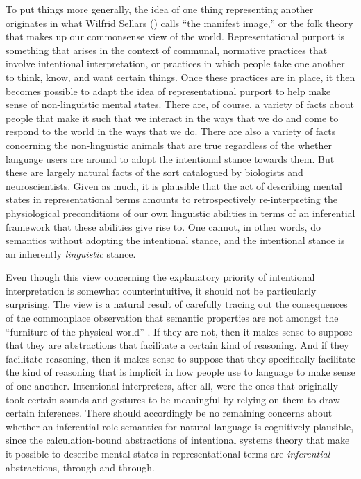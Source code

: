 To put things more generally, the idea of one thing representing another originates in what Wilfrid Sellars (\citeyear{Sellars:1963}) calls ``the manifest image,'' or the folk theory that makes up our commonsense view of the world. Representational purport is something that arises in the context of communal, normative practices that involve intentional interpretation, or practices in which people take one another to think, know, and want certain things. Once these practices are in place, it then becomes possible to adapt the idea of representational purport to help make sense of non-linguistic mental states. There are, of course, a variety of facts about people that make it such that we interact in the ways that we do and come to respond to the world in the ways that we do. There are also a variety of facts concerning the non-linguistic animals that are true regardless of the whether language users are around to adopt the intentional stance towards them. But these are largely natural facts of the sort catalogued by biologists and neuroscientists. Given as much, it is plausible that the act of describing mental states in representational terms amounts to retrospectively re-interpreting the physiological preconditions of our own linguistic abilities in terms of an inferential framework that these abilities give rise to. One cannot, in other words, do semantics without adopting the intentional stance, and the intentional stance is an inherently \textit{linguistic} stance. 

Even though this view concerning the explanatory priority of intentional interpretation is somewhat counterintuitive, it should not be particularly surprising. The view is a natural result of carefully tracing out the consequences of the commonplace observation that semantic properties are not amongst the ``furniture of the physical world'' \citep[][p. 72]{Dennett:1987}. If they are not, then it makes sense to suppose that they are abstractions that facilitate a certain kind of reasoning. And if they facilitate reasoning, then it makes sense to suppose that they specifically facilitate the kind of reasoning that is implicit in how people use to language to make sense of one another. Intentional interpreters, after all, were the ones that originally took certain sounds and gestures to be meaningful by relying on them to draw certain inferences. There should accordingly be no remaining concerns about whether an inferential role semantics for natural language is cognitively plausible, since the calculation-bound abstractions of intentional systems theory that make it possible to describe mental states in representational terms are \textit{inferential} abstractions, through and through.
